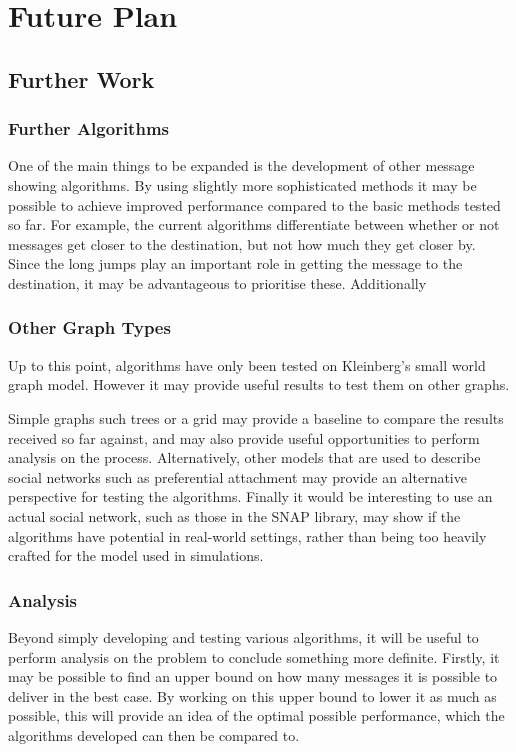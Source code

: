 \documentclass[bsc,frontabs,twoside,singlespacing,parskip,deptreport]{infthesis}     %
\begin{document}
\chapter{Future Plan}
\section{Further Work}

\subsection{Further Algorithms}
One of the main things to be expanded is the development of other message showing algorithms. By using slightly more sophisticated methods it may be possible to achieve improved performance compared to the basic methods tested so far. For example, the current algorithms differentiate between whether or not messages get closer to the destination, but not how much they get closer by. Since the long jumps play an important role in getting the message to the destination, it may be advantageous to prioritise these. Additionally 

\subsection{Other Graph Types}
Up to this point, algorithms have only been tested on Kleinberg's small world graph model. However it may provide useful results to test them on other graphs. 

Simple graphs such trees or a grid may provide a baseline to compare the results received so far against, and may also provide useful opportunities to perform analysis on the process. Alternatively, other models that are used to describe social networks such as preferential attachment may provide an alternative perspective for testing the algorithms. Finally it would be interesting to use an actual social network, such as those in the SNAP library\cite{snapnets}, may show if the algorithms have potential in real-world settings, rather than being too heavily crafted for the model used in simulations.

\subsection{Analysis}
Beyond simply developing and testing various algorithms, it will be useful to perform analysis on the problem to conclude something more definite. Firstly, it may be possible to find an upper bound on how many messages it is possible to deliver in the best case. By working on this upper bound to lower it as much as possible, this will provide an idea of the optimal possible performance, which the algorithms developed can then be compared to.
\end{document}

